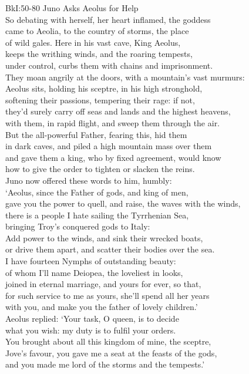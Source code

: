 \documentclass[12pt, a5paper, titlepage]{letter}
\begin{document}
{BkI:50-80 Juno Asks Aeolus for Help}\\
So debating with herself, her heart inflamed, the goddess\\
came to Aeolia, to the country of storms, the place\\
of wild gales. Here in his vast cave, King Aeolus,\\
keeps the writhing winds, and the roaring tempests,\\
under control, curbs them with chains and imprisonment.\\
They moan angrily at the doors, with a mountain's vast murmurs:\\
Aeolus sits, holding his sceptre, in his high stronghold,\\
softening their passions, tempering their rage: if not,\\
they'd surely carry off seas and lands and the highest heavens,\\
with them, in rapid flight, and sweep them through the air.\\
But the all-powerful Father, fearing this, hid them\\
in dark caves, and piled a high mountain mass over them\\
and gave them a king, who by fixed agreement, would know\\
how to give the order to tighten or slacken the reins.\\
Juno now offered these words to him, humbly:\\
`Aeolus, since the Father of gods, and king of men,\\
gave you the power to quell, and raise, the waves with the winds,\\
there is a people I hate sailing the Tyrrhenian Sea,\\
bringing Troy's conquered gods to Italy:\\
Add power to the winds, and sink their wrecked boats,\\
or drive them apart, and scatter their bodies over the sea.\\
I have fourteen Nymphs of outstanding beauty:\\
of whom I'll name Deiopea, the loveliest in looks,\\
joined in eternal marriage, and yours for ever, so that,\\
for such service to me as yours, she'll spend all her years\\
with you, and make you the father of lovely children.'\\
Aeolus replied: `Your task, O queen, is to decide\\
what you wish: my duty is to fulfil your orders.\\
You brought about all this kingdom of mine, the sceptre,\\
Jove's favour, you gave me a seat at the feasts of the gods,\\
and you made me lord of the storms and the tempests.'
\end{document}
